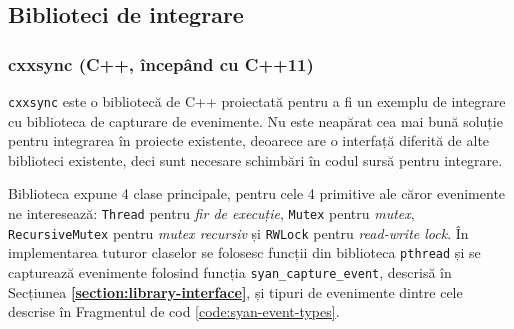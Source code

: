\subsection{Biblioteci de integrare}
\label{integration-libraries}

\subsubsection{cxxsync (C++, începând cu C++11)}
\lstinline{cxxsync} este o bibliotecă de C++ proiectată pentru a fi un
exemplu de integrare cu biblioteca de capturare de evenimente. Nu este
neapărat cea mai bună soluție pentru integrarea în proiecte existente,
deoarece are o interfață diferită de alte biblioteci existente, deci
sunt necesare schimbări în codul sursă pentru integrare.

Biblioteca expune 4 clase principale, pentru cele 4 primitive ale căror
evenimente ne interesează: \lstinline{Thread} pentru
\textit{fir de execuție}, \lstinline{Mutex} pentru \textit{mutex},
\lstinline{RecursiveMutex} pentru \textit{mutex recursiv} și
\lstinline{RWLock} pentru \textit{read-write lock}. În implementarea
tuturor claselor se folosesc funcții din biblioteca \lstinline{pthread}
și se capturează evenimente folosind funcția
\lstinline{syan_capture_event}, descrisă în Secțiunea
\textbf{\ref{section:library-interface}}, și tipuri de evenimente dintre
cele descrise în Fragmentul de cod \ref{code:syan-event-types}.

